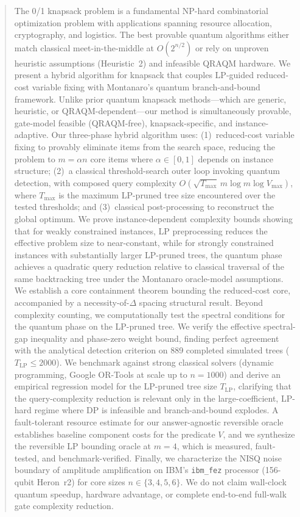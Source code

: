 \documentclass[conference]{IEEEtran} \IEEEoverridecommandlockouts
\begin{document}
\begin{abstract} The 0/1 knapsack problem is a fundamental NP-hard combinatorial optimization problem with applications spanning resource allocation, cryptography, and logistics. The best provable quantum algorithms either match classical meet-in-the-middle at $O(2^{n/2})$ or rely on unproven heuristic assumptions (Heuristic~2) and infeasible QRAQM hardware. We present a hybrid algorithm for knapsack that couples LP-guided reduced-cost variable fixing with Montanaro's quantum branch-and-bound framework. Unlike prior quantum knapsack methods---which are generic, heuristic, or QRAQM-dependent---our method is simultaneously provable, gate-model feasible (QRAQM-free), knapsack-specific, and instance-adaptive. Our three-phase hybrid algorithm uses: (1)~reduced-cost variable fixing to provably eliminate items from the search space, reducing the problem to $m = \alpha n$ core items where $\alpha \in [0, 1]$ depends on instance structure; (2)~a classical threshold-search outer loop invoking quantum detection, with composed query complexity $O\!\left(\sqrt{T_{\max}}\,m\log m\log V_{\max}\right)$, where $T_{\max}$ is the maximum LP-pruned tree size encountered over the tested thresholds; and (3)~classical post-processing to reconstruct the global optimum. We prove instance-dependent complexity bounds showing that for weakly constrained instances, LP preprocessing reduces the effective problem size to near-constant, while for strongly constrained instances with substantially larger LP-pruned trees, the quantum phase achieves a quadratic query reduction relative to classical traversal of the same backtracking tree under the Montanaro oracle-model assumptions. We establish a core containment theorem bounding the reduced-cost core, accompanied by a necessity-of-$\Delta$ spacing structural result. Beyond complexity counting, we computationally test the spectral conditions for the quantum phase on the LP-pruned tree. We verify the effective spectral-gap inequality and phase-zero weight bound, finding perfect agreement with the analytical detection criterion on 889 completed simulated trees ($T_{\text{LP}} \le 2000$). We benchmark against strong classical solvers (dynamic programming, Google OR-Tools at scale up to $n=1000$) and derive an empirical regression model for the LP-pruned tree size $T_{\text{LP}}$, clarifying that the query-complexity reduction is relevant only in the large-coefficient, LP-hard regime where DP is infeasible and branch-and-bound explodes. A fault-tolerant resource estimate for our answer-agnostic reversible oracle establishes baseline component costs for the predicate $V$, and we synthesize the reversible LP bounding oracle at $m=4$, which is measured, fault-tested, and benchmark-verified. Finally, we characterize the NISQ noise boundary of amplitude amplification on IBM's \texttt{ibm\_fez} processor (156-qubit Heron~r2) for core sizes $n \in \{3, 4, 5, 6\}$. We do not claim wall-clock quantum speedup, hardware advantage, or complete end-to-end full-walk gate complexity reduction. \end{abstract}
\end{document}
